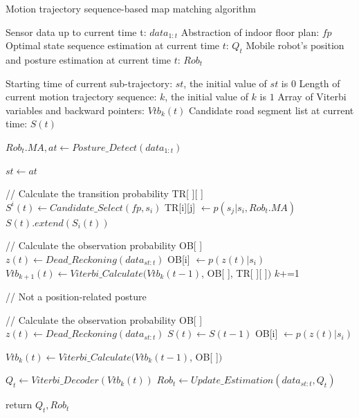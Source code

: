 \documentclass{llncs}
\begin{document}
\begin{algorithm}[H]
	\caption{Motion trajectory sequence-based map matching algorithm}
	\label{alg_aifi}
	\begin{algorithmic}[1]
		
		\renewcommand{\algorithmicrequire}{\textbf{Input:}}
		\renewcommand{\algorithmicensure}{\textbf{Output:}}
		\REQUIRE Sensor data up to current time t: $data_{1:t}$
		\REQUIRE Abstraction of indoor floor plan: $fp$
		\ENSURE Optimal state sequence estimation at current time $t$: $Q_t$
		\ENSURE Mobile robot's position and posture estimation at current time $t$: ${Rob}_t$
		
		\renewcommand{\algorithmicrequire}{\textbf{Define:}}
		\REQUIRE Starting time of current sub-trajectory: $st$, the initial value of $st$ is $0$
		\REQUIRE Length of current motion trajectory sequence: $k$, the initial value of $k$ is $1$
		\REQUIRE Array of Viterbi variables and backward pointers: ${Vtb}_{k}(t)$
		\REQUIRE Candidate road segment list at current time: $S(t)$
		
		
		\STATE ${{Rob}_{t}.{MA}}, at \leftarrow Posture\_Detect({data_{1:t}})$
		
		
			\STATE ${st} \leftarrow {at}$  
			
			\STATE // Calculate the transition probability TR[ ][ ]
			\STATE $S^i(t) \leftarrow Candidate\_Select(fp, s_i)$
			\STATE TR[i][j] $\leftarrow p(s_j|s_i,Rob_t.MA)$
			\ENDFOR
			\STATE $S(t).extend(S_i(t))$
			\ENDFOR
			
			\STATE // Calculate the observation probability OB[ ]
			\STATE $z(t) \leftarrow Dead\_Reckoning(data_{st:t})$
			\STATE OB[i] $\leftarrow p(z(t)|s_i)$
			\ENDFOR
			\STATE $Vtb_{k+1}(t) \leftarrow Viterbi\_Calculate(Vtb_{k}(t-1)$, OB[ ], TR[ ][ ]$)$
			\STATE $k$+=1
		
		\ELSE // Not a position-related posture
		
			\STATE // Calculate the observation probability OB[ ]
			\STATE $z(t) \leftarrow Dead\_Reckoning(data_{st:t})$
			\STATE $S(t) \leftarrow S(t-1)$
			\STATE OB[i] $\leftarrow p(z(t)|s_i)$
			\ENDFOR
			
			\STATE $Vtb_{k}(t) \leftarrow Viterbi\_Calculate(Vtb_{k}(t-1)$, OB[ ]$)$
			
		\ENDIF
		
		\STATE $Q_t \leftarrow Viterbi\_Decoder(Vtb_{k}(t))$
		\STATE $Rob_t \leftarrow Update\_Estimation(data_{st:t}, Q_t)$
		
		\State return $Q_t, Rob_t$
	\end{algorithmic}
\end{algorithm}
\end{document}
